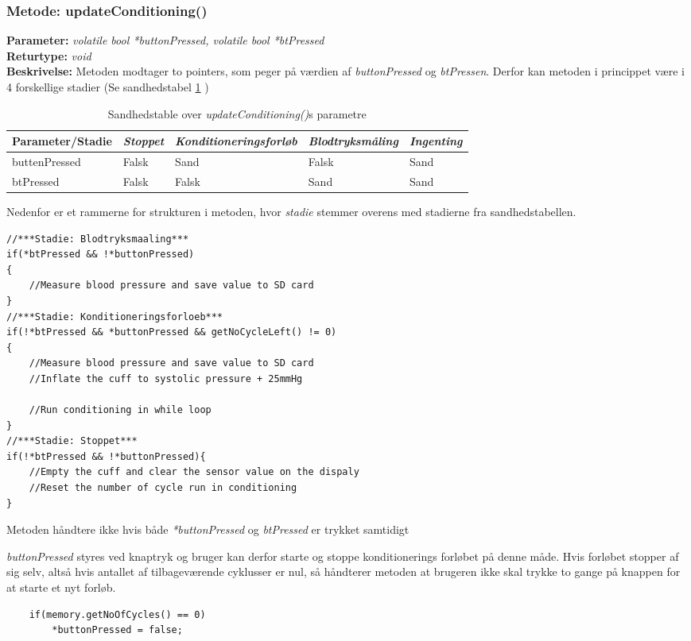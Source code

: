 \subsubsection{Metode: updateConditioning()}
\textbf{Parameter: } \textit{volatile bool *buttonPressed, volatile bool *btPressed}
\\ \textbf{Returtype: } \textit{void}
\\ \textbf{Beskrivelse: } Metoden modtager to pointers, som peger på værdien af \textit{buttonPressed} og \textit{btPressen}. Derfor kan metoden i princippet være i 4 forskellige stadier (Se sandhedstabel \ref{tabel:truthtable} )
\begin{table}[H]
	\centering
	\begin{tabular}{|l|l|l|l|l|}
	\hline
	Parameter/Stadie & \textit{Stoppet} & \textit{Konditioneringsforløb} & \textit{Blodtryksmåling} & \textit{Ingenting} \\ \hline
	buttenPressed    & Falsk   & Sand                  & Falsk & Sand            \\ \hline
	btPressed        & Falsk   & Falsk                 & Sand     & Sand        \\ \hline
	\end{tabular}
	\caption{Sandhedstable over \textit{updateConditioning()}s parametre} \label{tabel:truthtable}
\end{table}

Nedenfor er et rammerne for strukturen i metoden, hvor \textit{stadie} stemmer overens med stadierne fra sandhedstabellen. 

\begin{lstlisting}
//***Stadie: Blodtryksmaaling***
if(*btPressed && !*buttonPressed)
{
	//Measure blood pressure and save value to SD card
}
//***Stadie: Konditioneringsforloeb***
if(!*btPressed && *buttonPressed && getNoCycleLeft() != 0)
{
	//Measure blood pressure and save value to SD card
	//Inflate the cuff to systolic pressure + 25mmHg
	
	//Run conditioning in while loop 
}
//***Stadie: Stoppet***
if(!*btPressed && !*buttonPressed){
	//Empty the cuff and clear the sensor value on the dispaly 
	//Reset the number of cycle run in conditioning
}

\end{lstlisting}

Metoden håndtere ikke hvis både \textit{*buttonPressed} og \textit{btPressed} er trykket samtidigt

\textit{buttonPressed} styres ved knaptryk og bruger kan derfor starte og stoppe konditionerings forløbet på denne måde. Hvis forløbet stopper af sig selv, altså hvis antallet af tilbageværende cyklusser er nul, så håndterer metoden at brugeren ikke skal trykke to gange på knappen for at starte et nyt forløb. 
\begin{lstlisting}
	if(memory.getNoOfCycles() == 0)
		*buttonPressed = false;
\end{lstlisting}

